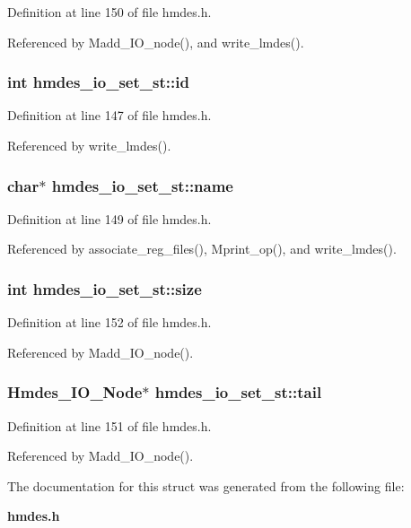 Definition at line 150 of file hmdes.h.

Referenced by Madd\_\-IO\_\-node(), and write\_\-lmdes().
\subsubsection{\setlength{\rightskip}{0pt plus 5cm}int \bf{hmdes\_\-io\_\-set\_\-st::id}}\label{structhmdes__io__set__st_097db74dde62d0b5d1fd4e149673c5ab}




Definition at line 147 of file hmdes.h.

Referenced by write\_\-lmdes().
\subsubsection{\setlength{\rightskip}{0pt plus 5cm}char$\ast$ \bf{hmdes\_\-io\_\-set\_\-st::name}}\label{structhmdes__io__set__st_20fb123dd7e30a2e1c06aed923787f6d}




Definition at line 149 of file hmdes.h.

Referenced by associate\_\-reg\_\-files(), Mprint\_\-op(), and write\_\-lmdes().
\subsubsection{\setlength{\rightskip}{0pt plus 5cm}int \bf{hmdes\_\-io\_\-set\_\-st::size}}\label{structhmdes__io__set__st_27a7bec67b6b62ffdec3c830c3f0d203}




Definition at line 152 of file hmdes.h.

Referenced by Madd\_\-IO\_\-node().
\subsubsection{\setlength{\rightskip}{0pt plus 5cm}\bf{Hmdes\_\-IO\_\-Node}$\ast$ \bf{hmdes\_\-io\_\-set\_\-st::tail}}\label{structhmdes__io__set__st_b5162446cbb5cb65ac82c0b52e42ecf4}




Definition at line 151 of file hmdes.h.

Referenced by Madd\_\-IO\_\-node().

The documentation for this struct was generated from the following file:\begin{CompactItemize}
\item 
\bf{hmdes.h}\end{CompactItemize}
